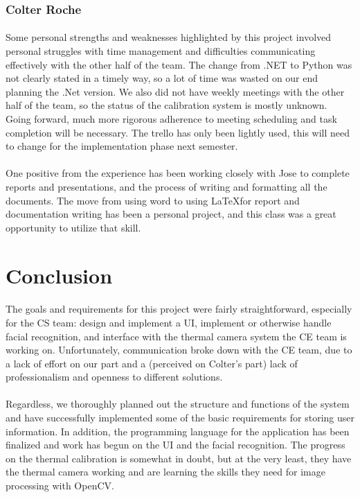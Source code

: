 \documentclass[12pt, letterpaper]{article}
\begin{document}
    \subsubsection{Colter Roche}
    \paragraph{}
    Some personal strengths and weaknesses highlighted by this project involved personal 
    struggles with time management and difficulties communicating effectively with the other 
    half of the team.  The change from .NET to Python was not clearly stated in a timely way, 
    so a lot of time was wasted on our end planning the .Net version.  We also did not have 
    weekly meetings with the other half of the team, so the status of the calibration system is 
    mostly unknown.  Going forward, much more rigorous adherence to meeting scheduling and task 
    completion will be necessary.  The trello has only been lightly used, this will need to 
    change for the implementation phase next semester.  
    \paragraph{}
    One positive from the experience has been working closely with Jose to complete reports and 
    presentations, and the process of writing and formatting all the documents.  The move from 
    using word to using \LaTeX for report and documentation writing has been a personal project, 
    and this class was a great opportunity to utilize that skill.
    \newpage
    \section{Conclusion}
    \paragraph{}
    The goals and requirements for this project were fairly straightforward, especially for the 
    CS team: design and implement a UI, implement or otherwise handle facial recognition, and 
    interface with the thermal camera system the CE team is working on.  Unfortunately, 
    communication broke down with the CE team, due to a lack of effort on our part and a 
    (perceived on Colter’s part) lack of professionalism and openness to different solutions.  
    \paragraph{}
    Regardless, we thoroughly planned out the structure and functions of the system and have 
    successfully implemented some of the basic requirements for storing user information.  
    In addition, the programming language for the application has been finalized and work has 
    begun on the UI and the facial recognition.  The progress on the thermal calibration is 
    somewhat in doubt, but at the very least, they have the thermal camera working and are 
    learning the skills they need for image processing with OpenCV.
\end{document}
